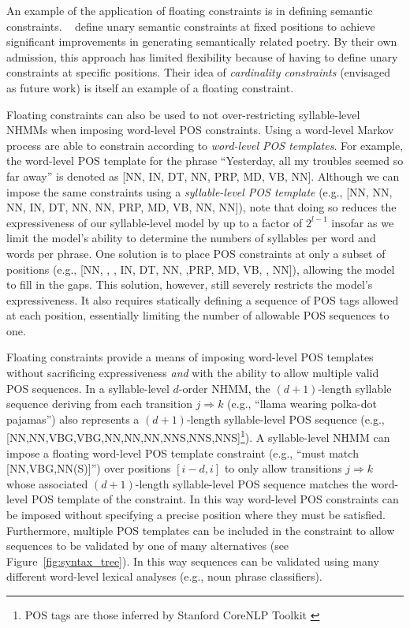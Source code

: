 \documentclass[phd,electronic,oneside,twosidetoc,letterpaper,chaptercenter,parttop,lof,lot]{byumsphd}
\begin{document}
An example of the application of floating constraints is in defining semantic constraints. \citeauthor{barbieri2012markov}~\cite{barbieri2012markov} define unary semantic constraints at fixed positions to achieve significant improvements in generating semantically related poetry. By their own admission, this approach has limited flexibility because of having to define unary constraints at specific positions. Their idea of \textit{cardinality constraints} (envisaged as future work) is itself an example of a floating constraint.

Floating constraints can also be used to not over-restricting syllable-level NHMMs when imposing word-level POS constraints. Using a word-level Markov process \citeauthor{barbieri2012markov} \cite{barbieri2012markov} are able to constrain according to \textit{word-level POS templates}. For example, the word-level POS template for the phrase ``Yesterday, all my troubles seemed so far away'' is denoted as [NN, IN, DT, NN, PRP, MD, VB, NN]. Although we can impose the same constraints using a \textit{syllable-level POS template} (e.g., [NN, NN, NN, IN, DT, NN, NN, PRP, MD, VB, NN, NN]), note that doing so reduces the expressiveness of our syllable-level model by up to a factor of $2^{l-1}$ insofar as we limit the model's ability to determine the numbers of syllables per word and words per phrase. One solution is to place POS constraints at only a subset of positions (e.g., [NN, , , IN, DT, NN, ,PRP, MD, VB, , NN]), allowing the model to fill in the gaps. This solution, however, still severely restricts the model's expressiveness. It also requires statically defining a sequence of POS tags allowed at each position, essentially limiting the number of allowable POS sequences to one.

Floating constraints provide a means of imposing word-level POS templates without sacrificing expressiveness \textit{and} with the ability to allow multiple valid POS sequences. In a syllable-level $d$-order NHMM, the $(d + 1)$-length syllable sequence deriving from each transition $j \Rightarrow k$ (e.g., ``llama wearing polka-dot pajamas'') also represents a $(d+1)$-length syllable-level POS sequence (e.g., {[NN,NN,VBG,VBG,NN,NN,NN,NNS,NNS,NNS]}\footnote{\label{note1}POS tags are those inferred by Stanford CoreNLP Toolkit \cite{Manning2014}}). A syllable-level NHMM can impose a floating word-level POS template constraint (e.g., ``must match {[NN,VBG,NN(S)]}'') over positions $[i-d,i]$ to only allow transitions $j \Rightarrow k$ whose associated $(d+1)$-length syllable-level POS sequence matches the word-level POS template of the constraint. In this way word-level POS constraints can be imposed without specifying a precise position where they must be satisfied. Furthermore, multiple POS templates can be included in the constraint to allow sequences to be validated by one of many alternatives (see Figure~\ref{fig:syntax_tree}). In this way sequences can be validated using many different word-level lexical analyses (e.g., noun phrase classifiers).
\end{document}
